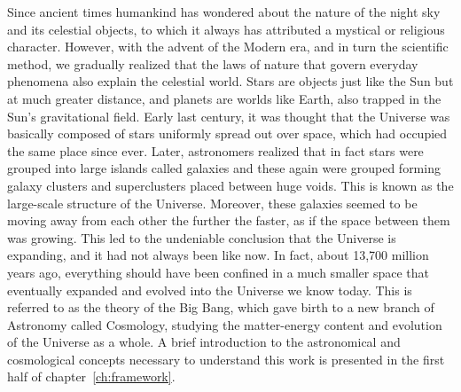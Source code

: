 Since ancient times humankind has wondered about the nature of the night sky and its celestial objects, to which it always has attributed a mystical or religious character. However, with the advent of the Modern era, and in turn the scientific method, we gradually realized that the laws of nature that govern everyday phenomena also explain the celestial world. Stars are objects just like the Sun but at much greater distance, and planets are worlds like Earth, also trapped in the Sun's gravitational field. Early last century, it was thought that the Universe was basically composed of stars uniformly spread out over space, which had occupied the same place since ever. Later, astronomers realized that in fact stars were grouped into large islands called galaxies and these again were grouped forming galaxy clusters and superclusters placed between huge voids. This is known as the large-scale structure of the Universe. Moreover, these galaxies seemed to be moving away from each other the further the faster, as if the space between them was growing. This led to the undeniable conclusion that the Universe is expanding, and it had not always been like now. In fact, about 13,700 million years ago, everything should have been confined in a much smaller space that eventually expanded and evolved into the Universe we know today. This is referred to as the theory of the Big Bang, which gave birth to a new branch of Astronomy called Cosmology, studying the matter-energy content and evolution of the Universe as a whole. A brief introduction to the astronomical and cosmological concepts necessary to understand this work is presented in the first half of chapter~\ref{ch:framework}.

